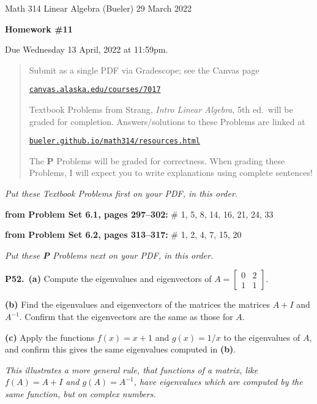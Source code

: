 \documentclass[12pt]{amsart}
\newcommand{\ds}{\displaystyle}
\newcommand{\prob}[1]{\bigskip\noindent\textbf{#1.}\quad }
\newcommand{\probset}[2]{\bigskip\noindent\textbf{from Problem Set #1, pages #2:}\quad }
\newcommand{\epart}[1]{\medskip\noindent\textbf{(#1)}\quad }
\newcommand{\ppart}[1]{\,\textbf{(#1)}\quad }
\begin{document}
\scriptsize \noindent Math 314 Linear Algebra (Bueler) \hfill 29 March 2022
\normalsize\medskip

\Large
\centerline{\textbf{Homework \#11}}

\bigskip
\large
\centerline{Due Wednesday 13 April, 2022 at 11:59pm.}

\normalsize
\bigskip
\begin{quote}
\medskip
\noindent Submit as a single PDF via Gradescope; see the Canvas page

\href{https://canvas.alaska.edu/courses/7017}{\texttt{canvas.alaska.edu/courses/7017}}

\noindent Textbook Problems from Strang, \emph{Intro Linear Algebra}, 5th ed.~will be graded for completion.  Answers/solutions to these Problems are linked at

\href{https://bueler.github.io/math314/resources.html}{\texttt{bueler.github.io/math314/resources.html}}

\noindent The \textbf{P} Problems will be graded for correctness.  When grading these Problems, I will expect you to write explanations using complete sentences!
\end{quote}
\medskip

\thispagestyle{empty}

\noindent \hrulefill

\noindent \emph{Put these Textbook Problems first on your PDF, in this order.}

\probset{6.1}{297--302} \# 1, 5, 8, 14, 16, 21, 24, 33

\probset{6.2}{313--317} \# 1, 2, 4, 7, 15, 20

\bigskip
\noindent \hrulefill

\noindent \emph{Put these \textbf{P} Problems next on your PDF, in this order.}

\prob{P52}  \ppart{a}  Compute the eigenvalues and eigenvectors of $\ds A = \begin{bmatrix} 0 & 2 \\ 1 & 1 \end{bmatrix}$.

\epart{b}  Find the eigenvalues and eigenvectors of the matrices the matrices $A+I$ and $A^{-1}$.  Confirm that the eigenvectors are the same as those for $A$.

\epart{c}  Apply the functions $f(x) = x+1$ and $g(x) = 1/x$ to the eigenvalues of $A$, and confirm this gives the same eigenvalues computed in \textbf{(b)}.

\medskip
\noindent \emph{This illustrates a more general rule, that functions of a matrix, like $f(A)=A+I$ and $g(A)=A^{-1}$, have eigenvalues which are computed by the same function, but on complex numbers.}
\end{document}
